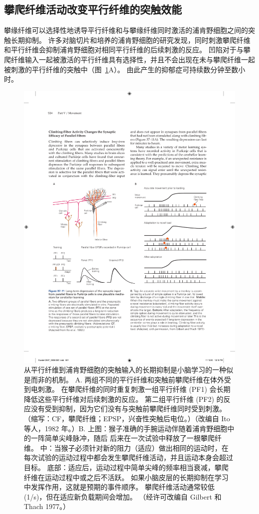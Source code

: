 \subsection{攀爬纤维活动改变平行纤维的突触效能}

攀缘纤维可以选择性地诱导平行纤维和与攀缘纤维同时激活的浦肯野细胞之间的突触长期抑制。
许多对脑切片和培养的浦肯野细胞的研究发现，同时刺激攀爬纤维和平行纤维会抑制浦肯野细胞对相同平行纤维的后续刺激的反应。
凹陷对于与攀爬纤维输入一起被激活的平行纤维具有选择性，并且不会出现在未与攀爬纤维一起被刺激的平行纤维的突触中（图~\ref{fig:37_11}A）。
由此产生的抑郁症可持续数分钟至数小时。


\begin{figure}[htbp]
	\centering
	\includegraphics[width=0.9\linewidth]{chap37/fig_37_11}
	\caption{从平行纤维到浦肯野细胞的突触输入的长期抑制是小脑学习的一种似是而非的机制。 A. 两组不同的平行纤维和突触前攀爬纤维在体外受到电刺激。 在攀爬纤维的同时重复刺激一组平行纤维 (PF1) 会长期降低这些平行纤维对后续刺激的反应。 第二组平行纤维 (PF2) 的反应没有受到抑制，因为它们没有与突触前攀爬纤维同时受到刺激。 （缩写：CF，攀爬纤维；EPSP，兴奋性突触后电位。）（改编自 Ito 等人，1982 年。）B. 上图：猴子准确的手腕运动伴随着浦肯野细胞中的一阵简单尖峰脉冲，随后 后来在一次试验中释放了一根攀爬纤维。 中：当猴子必须针对新的阻力（适应）做出相同的运动时，在每次试验的运动过程中都会发生攀爬纤维活动，并且运动本身会超过目标。 底部：适应后，运动过程中简单尖峰的频率相当衰减，攀爬纤维在运动过程中或之后不活跃。 如果小脑皮层的长期抑制在学习中发挥作用，这就是预期的事件顺序。 攀爬纤维活动通常较低 (1/s)，但在适应新负载期间会增加。 （经许可改编自 Gilbert 和 Thach 1977。）}
	\label{fig:37_11}
\end{figure}


